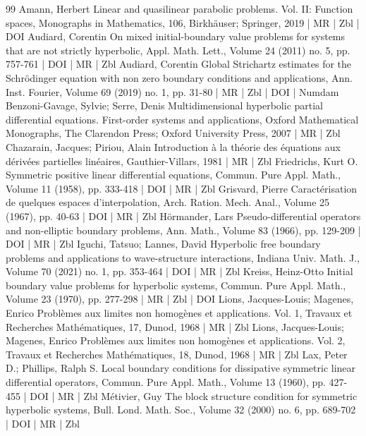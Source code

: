 \documentclass[10pt]{amsart}
\theoremstyle{definition}\newtheorem{defi}[theo]{Definition}\newtheorem{rema}[theo]{Remark}\newtheorem{exam}[theo]{Example}\newtheorem{exem}[theo]{Example}\newtheorem{nota}[theo]{Notation}
\begin{document}
\begin{thebibliography}{99}
Amann, Herbert Linear and quasilinear parabolic problems. Vol. II: Function spaces, Monographs in Mathematics, 106, Birkhäuser; Springer, 2019 | MR | Zbl | DOI
Audiard, Corentin On mixed initial-boundary value problems for systems that are not strictly hyperbolic, Appl. Math. Lett., Volume 24 (2011) no. 5, pp. 757-761 | DOI | MR | Zbl
Audiard, Corentin Global Strichartz estimates for the Schrödinger equation with non zero boundary conditions and applications, Ann. Inst. Fourier, Volume 69 (2019) no. 1, pp. 31-80 | MR | Zbl | DOI | Numdam
Benzoni-Gavage, Sylvie; Serre, Denis Multidimensional hyperbolic partial differential equations. First-order systems and applications, Oxford Mathematical Monographs, The Clarendon Press; Oxford University Press, 2007 | MR | Zbl
Chazarain, Jacques; Piriou, Alain Introduction à la théorie des équations aux dérivées partielles linéaires, Gauthier-Villars, 1981 | MR | Zbl
Friedrichs, Kurt O. Symmetric positive linear differential equations, Commun. Pure Appl. Math., Volume 11 (1958), pp. 333-418 | DOI | MR | Zbl
Grisvard, Pierre Caractérisation de quelques espaces d’interpolation, Arch. Ration. Mech. Anal., Volume 25 (1967), pp. 40-63 | DOI | MR | Zbl
Hörmander, Lars Pseudo-differential operators and non-elliptic boundary problems, Ann. Math., Volume 83 (1966), pp. 129-209 | DOI | MR | Zbl
Iguchi, Tatsuo; Lannes, David Hyperbolic free boundary problems and applications to wave-structure interactions, Indiana Univ. Math. J., Volume 70 (2021) no. 1, pp. 353-464 | DOI | MR | Zbl
Kreiss, Heinz-Otto Initial boundary value problems for hyperbolic systems, Commun. Pure Appl. Math., Volume 23 (1970), pp. 277-298 | MR | Zbl | DOI
Lions, Jacques-Louis; Magenes, Enrico Problèmes aux limites non homogènes et applications. Vol. 1, Travaux et Recherches Mathématiques, 17, Dunod, 1968 | MR | Zbl
Lions, Jacques-Louis; Magenes, Enrico Problèmes aux limites non homogènes et applications. Vol. 2, Travaux et Recherches Mathématiques, 18, Dunod, 1968 | MR | Zbl
Lax, Peter D.; Phillips, Ralph S. Local boundary conditions for dissipative symmetric linear differential operators, Commun. Pure Appl. Math., Volume 13 (1960), pp. 427-455 | DOI | MR | Zbl
Métivier, Guy The block structure condition for symmetric hyperbolic systems, Bull. Lond. Math. Soc., Volume 32 (2000) no. 6, pp. 689-702 | DOI | MR | Zbl

\end{thebibliography}
\end{document}
